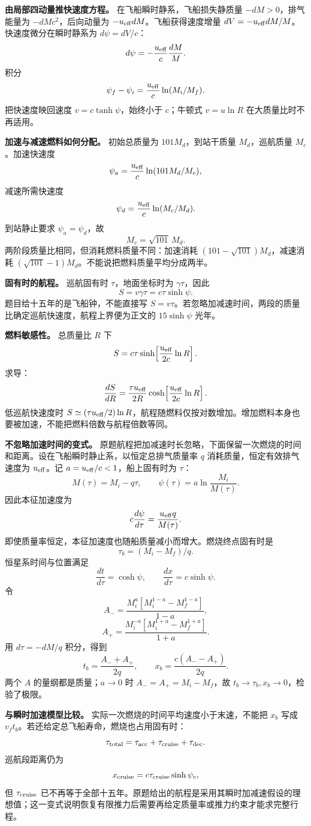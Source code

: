 \documentclass[12pt,a4paper,UTF8]{ctexart}
\begin{document}
\textbf{由局部四动量推快速度方程。} 在飞船瞬时静系，飞船损失静质量
\(-dM>0\)，排气能量为 \(-dM c^2\)，后向动量为
\(-u_{\rm eff}dM\)。飞船获得速度增量
\(dV=-u_{\rm eff}dM/M\)。快速度微分在瞬时静系为 \(d\psi=dV/c\)： \[
d\psi=-\frac{u_{\rm eff}}c\frac{dM}{M}.
\] 积分 \[
\psi_f-\psi_i=\frac{u_{\rm eff}}c\ln(M_i/M_f).
\] 把快速度映回速度 \(v=c\tanh\psi\)，始终小于 \(c\)；牛顿式
\(v=u\ln R\) 在大质量比时不再适用。

\textbf{加速与减速燃料如何分配。} 初始总质量为 \(101M_d\)，到站干质量
\(M_d\)，巡航质量 \(M_c\)。加速快速度 \[
\psi_a=\frac{u_{\rm eff}}c\ln(101M_d/M_c),
\] 减速所需快速度 \[
\psi_d=\frac{u_{\rm eff}}c\ln(M_c/M_d).
\] 到站静止要求 \(\psi_a=\psi_d\)，故 \[
\boxed{M_c=\sqrt{101}\,M_d}.
\] 两阶段质量比相同，但消耗燃料质量不同：加速消耗
\((101-\sqrt{101})M_d\)，减速消耗
\((\sqrt{101}-1)M_d\)。不能说把燃料质量平均分成两半。

\textbf{固有时的航程。} 巡航固有时 \(\tau\)，地面坐标时为
\(\gamma\tau\)，因此 \[
S=v\gamma\tau=c\tau\sinh\psi.
\] 题目给十五年的是飞船钟，不能直接写
\(S=v\tau\)。若忽略加减速时间，两段的质量比确定巡航快速度，航程上界便为正文的
\(15\sinh\psi\) 光年。

\textbf{燃料敏感性。} 总质量比 \(R\) 下 \[
S=c\tau\sinh\!\left[\frac{u_{\rm eff}}{2c}\ln R\right].
\] 求导： \[
\frac{dS}{dR}=\frac{\tau u_{\rm eff}}{2R}
\cosh\!\left[\frac{u_{\rm eff}}{2c}\ln R\right].
\] 低巡航快速度时
\(S\simeq(\tau u_{\rm eff}/2)\ln R\)，航程随燃料仅按对数增加。增加燃料本身也要被加速，不能把燃料倍数与航程倍数等同。

\textbf{不忽略加速时间的变式。}
原题航程把加减速时长忽略，下面保留一次燃烧的时间和距离。设在飞船瞬时静止系，以恒定总排气质量率
\(q\) 消耗质量，恒定有效排气速度为 \(u_{\rm eff}\)。记
\(a=u_{\rm eff}/c<1\)，船上固有时为 \(\tau\)： \[
M(\tau)=M_i-q\tau,\qquad
\psi(\tau)=a\ln\frac{M_i}{M(\tau)}.
\] 因此本征加速度为 \[
c\frac{d\psi}{d\tau}=\frac{u_{\rm eff}q}{M(\tau)}.
\] 即使质量率恒定，本征加速度也随船质量减小而增大。燃烧终点固有时是 \[
\tau_b=(M_i-M_f)/q.
\] 恒星系时间与位置满足 \[
\frac{dt}{d\tau}=\cosh\psi,\qquad
\frac{dx}{d\tau}=c\sinh\psi.
\] 令 \[
A_-=\frac{M_i^a[M_i^{1-a}-M_f^{1-a}]}{1-a},
\] \[
A_+=\frac{M_i^{-a}[M_i^{1+a}-M_f^{1+a}]}{1+a}.
\] 用 \(d\tau=-dM/q\) 积分，得到 \[
\boxed{t_b=\frac{A_-+A_+}{2q}},\qquad
\boxed{x_b=\frac{c(A_--A_+)}{2q}}.
\] 两个 \(A\) 的量纲都是质量；\(a\to0\) 时 \(A_-=A_+=M_i-M_f\)，故
\(t_b\to\tau_b,x_b\to0\)，检验了极限。

\textbf{与瞬时加速模型比较。} 实际一次燃烧的时间平均速度小于末速，不能把
\(x_b\) 写成 \(v_f t_b\)。若还给定总飞船寿命，燃烧也占用固有时： \[
\tau_{\rm total}=\tau_{\rm acc}+\tau_{\rm cruise}+\tau_{\rm dec}.
\] 巡航段距离仍为 \[
x_{\rm cruise}=c\tau_{\rm cruise}\sinh\psi_c,
\] 但 \(\tau_{\rm cruise}\)
已不再等于全部十五年。原题给出的航程是采用其瞬时加减速假设的理想值；这一变式说明恢复有限推力后需要再给定质量率或推力约束才能求完整行程。
\end{document}
